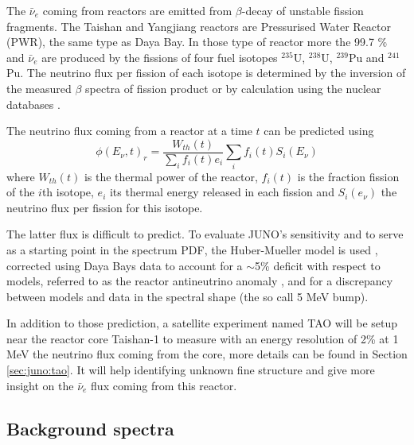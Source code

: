 \documentclass[../main.tex]{subfiles}
\begin{document}
The $\bar{\nu}_e$ coming from reactors are emitted from $\beta$-decay of unstable fission fragments. The Taishan and Yangjiang reactors are Pressurised Water Reactor (PWR), the same type as Daya Bay. In those type of reactor more the 99.7 \% and $\bar{\nu}_e$ are produced by the fissions of four fuel isotopes $^{235}$U, $^{238}$U, $^{239}$Pu and $^{241}$Pu. The neutrino flux per fission of each isotope is determined by the inversion of the measured $\beta$ spectra of fission product \cite{hahn_antineutrino_1989, mueller_improved_2011, von_feilitzsch_experimental_1982, schreckenbach_determination_1985, huber_determination_2011} or by calculation using the nuclear databases \cite{vogel_reactor_1981, dwyer_spectral_2015}.

The neutrino flux coming from a reactor at a time $t$ can be predicted using
\begin{equation}
  \phi(E_\nu, t)_r = \frac{W_{th}(t)}{\sum_i f_i(t) e_i} \sum_i f_i(t) S_i(E_\nu)
\end{equation}
where $W_{th}(t)$ is the thermal power of the reactor, $f_i(t)$ is the fraction fission of the $i$th isotope, $e_i$ its thermal energy released in each fission and $S_i(e_\nu)$ the neutrino flux per fission for this isotope.

The latter flux is difficult to predict. To evaluate JUNO's sensitivity and to serve as a starting point in the spectrum PDF, the Huber-Mueller model is used \cite{mueller_improved_2011}, corrected
using Daya Bays data \cite{daya_bay_collaboration_measurement_2016} to account for a $\sim$5\% deficit with respect to models, referred to as the reactor antineutrino anomaly \cite{mention_reactor_2011}, and for a discrepancy between models and data in the spectral shape (the so  call 5 MeV bump).

In addition to those prediction, a satellite experiment named TAO\cite{juno_collaboration_tao_2020} will be setup near the reactor core Taishan-1 to measure with an energy resolution of 2\% at 1 MeV the neutrino flux coming from the core, more details can be found in Section \ref{sec:juno:tao}. It will help identifying unknown fine structure and give more insight on the $\bar{\nu}_e$ flux coming from this reactor.

\subsection{Background spectra}
\end{document}
